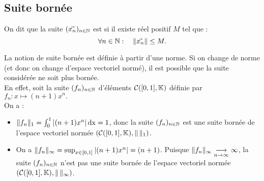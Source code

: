 \documentclass{book}
\begin{document}
\subsection{Suite bornée}
\begin{Definition}
On dit que la suite $(\vec{x_n})_{n\in\mathbb{N}}$ est  si il existe réel positif $M$ tel que :
$$\forall n \in \mathbb{N}:\quad \mathopen\lVert \vec{x_n} \mathclose\rVert\leq M.$$
\end{Definition}
\begin{Remarque}
La notion de suite bornée est définie à partir d'une norme. Si on change de norme (et donc on change d'espace vectoriel
normé), il est possible que la suite considérée ne soit plus bornée.\\
En effet, soit la suite $(f_n)_{n\in\mathbb{N}}$ d'éléments $\mathcal{C}([0,1],\mathbb{K})$ définie par $f_n:x\mapsto (n+1)x^n.$\\
On a :
\begin{itemize}
\item $\mathopen\lVert f_n \mathclose\rVert_{1}=\int_0^1  |(n+1)x^n|\,\mathrm{dx}=1$, donc la suite  $(f_n)_{n\in\mathbb{N}}$ est une suite bornée de l'espace vectoriel normée $(\mathcal{C}([0,1],\mathbb{K}), \mathopen\lVert \, \mathclose\rVert_1)$.
\item On a $\mathopen\lVert f_n \mathclose\rVert_{\infty}=\sup_{x\in[0,1]}|(n+1)x^n|=(n+1)$. Puisque $\norme{f_n}_{\infty}\tend[n\to\infty]\infty$, la suite  $(f_n)_{n\in\mathbb{N}}$ n'est pas une suite bornée de l'espace vectoriel normée $(\mathcal{C}([0,1],\mathbb{K}), \mathopen\lVert \, \mathclose\rVert_\infty)$.
\end{itemize}
\end{Remarque}
\end{document}
